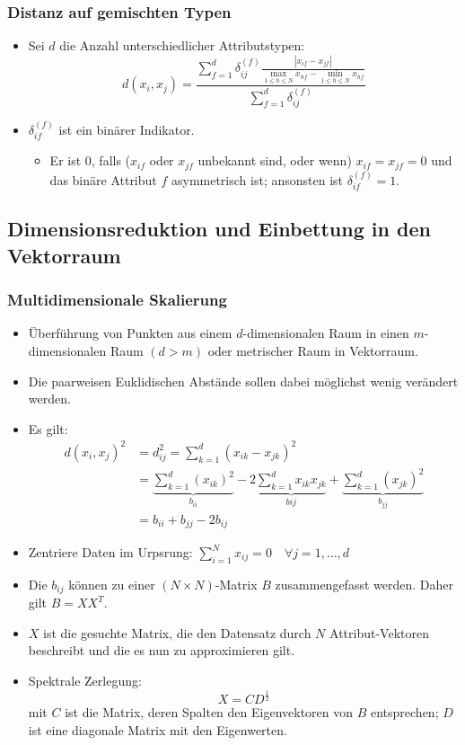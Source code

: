 \documentclass{scrartcl}
\begin{document}
\subsubsection{Distanz auf gemischten Typen}

\begin{itemize}
	\item Sei $ d $ die Anzahl unterschiedlicher Attributstypen:
	\[ d(x_i,x_j) = \frac{\sum_{f=1}^{d} \delta_{ij}^{(f)} \frac{|x_{if} - 
	x_{jf}|}{\max_{1 \leq h \leq N} x_{hf} - \min_{1 \leq h \leq N} 
	x_{hf}}}{\sum_{f=1}^{d} \delta_{ij}^{(f)}} \]
	\item $ \delta_{if}^{(f)} $ ist ein binärer Indikator.
	\begin{itemize}
		\item Er ist 0, falls ($ x_{if} $ oder $ x_{jf} $ unbekannt sind, oder 
		wenn) $ x_{if} = x_{jf} = 0 $ und das binäre Attribut $ f $ 
		asymmetrisch ist; ansonsten ist $ \delta_{if}^{(f)} = 1 $.
	\end{itemize}
\end{itemize}

\subsection{Dimensionsreduktion und Einbettung in den Vektorraum}

\subsubsection{Multidimensionale Skalierung}

\begin{itemize}
	\item Überführung von Punkten aus einem $ d $-dimensionalen Raum in einen $ 
	m $-dimensionalen Raum $ (d > m) $ oder metrischer Raum in Vektorraum.
	\item Die paarweisen Euklidischen Abstände sollen dabei möglichst wenig 
	verändert werden.
	\item Es gilt:
	\begin{align*}
		d(x_i,x_j)^2 &= d_{ij}^2 = \sum_{k=1}^{d} (x_{ik} - x_{jk})^2 \\
		&= \underbrace{\sum_{k=1}^{d} (x_{ik})^2}_{b_{ii}} - 2 
		\underbrace{\sum_{k=1}^{d} x_{ik} x_{jk}}_{b{ij}} + 
		\underbrace{\sum_{k=1}^{d} (x_{jk})^2}_{b_{jj}} \\
		&= b_{ii} + b_{jj} - 2b_{ij}
	\end{align*}
	\item Zentriere Daten im Urpsrung: $ \sum_{i=1}^{N} x_{ij} = 0 \quad 
	\forall j = 1,\ldots,d $
	\item Die $ b_{ij} $ können zu einer $ (N \times N) $-Matrix $ B $ 
	zusammengefasst werden. Daher gilt $ B=XX^T $.
	\item $ X $ ist die gesuchte Matrix, die den Datensatz durch $ N $ 
	Attribut-Vektoren beschreibt und die es nun zu approximieren gilt.
	\item Spektrale Zerlegung:
	\[ X = CD^{\frac{1}{2}} \]
	mit $ C $ ist die Matrix, deren Spalten den Eigenvektoren von $ B $ 
	entsprechen; $ D $ ist eine diagonale Matrix mit den Eigenwerten.
\end{itemize}
\end{document}
